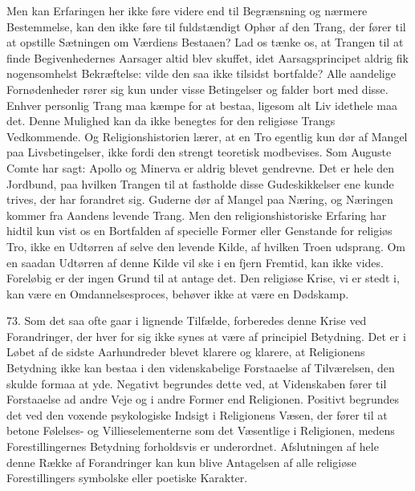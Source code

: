 \documentclass[12pt,a4paper,openany]{book}
\newcommand{\opage}[1]{\marginnote{\footnotesize\textit{[#1]}}}
\begin{document}
Men kan Erfaringen her ikke føre videre end til Begrænsning og nærmere
Bestemmelse, kan den ikke føre til fuldstændigt Ophør af den Trang, der
fører til at opstille Sætningen om Værdiens Bestaaen? Lad os tænke os,
at Trangen til at finde Begivenhedernes Aarsager altid blev skuffet,
idet Aarsagsprincipet aldrig fik nogensomhelst Bekræftelse: vilde den
saa ikke tilsidst bortfalde? Alle aandelige Fornødenheder rører sig kun
under visse Betingelser og falder bort med disse. Enhver personlig Trang
maa kæmpe for at bestaa, ligesom alt Liv idethele maa det. Denne
Mulighed kan da ikke benegtes for den religiøse Trangs Vedkommende. Og
Religionshistorien lærer, at en Tro egentlig kun dør af Mangel paa
Livsbetingelser, ikke fordi den strengt teoretisk modbevises. Som
Auguste Comte har sagt: Apollo og Minerva er aldrig blevet gendrevne.
Det er hele den Jordbund, paa hvilken Trangen til at fastholde disse
Gudeskikkelser ene kunde trives, der har forandret sig. Guderne dør af
Mangel paa Næring, og Næringen kommer fra Aandens levende Trang. Men den
religionshistoriske Erfaring har hidtil kun vist os en Bortfalden af
specielle Former eller Genstande for religiøs Tro, ikke en Udtørren af
selve den levende Kilde, af hvilken Troen udsprang.
\opage{170}Om en saadan Udtørren af denne Kilde vil ske i en fjern
Fremtid, kan ikke vides. Foreløbig er der ingen Grund til at antage det.
Den religiøse Krise, vi er stedt i, kan være en Omdannelsesproces,
behøver ikke at være en Dødskamp.

73. Som det saa ofte gaar i lignende Tilfælde, forberedes denne Krise
ved Forandringer, der hver for sig ikke synes at være af principiel
Betydning. Det er i Løbet af de sidste Aarhundreder blevet klarere og
klarere, at Religionens Betydning ikke kan bestaa i den videnskabelige
Forstaaelse af Tilværelsen, den skulde formaa at yde. Negativt begrundes
dette ved, at Videnskaben fører til Forstaaelse ad andre Veje og i andre
Former end Religionen. Positivt begrundes det ved den voxende
psykologiske Indsigt i Religionens Væsen, der fører til at betone
Følelses- og Villieselementerne som det Væsentlige i Religionen, medens
Forestillingernes Betydning forholdsvis er underordnet. Afslutningen af
hele denne Række af Forandringer kan kun blive Antagelsen af alle
religiøse Forestillingers symbolske eller poetiske Karakter.
\end{document}
